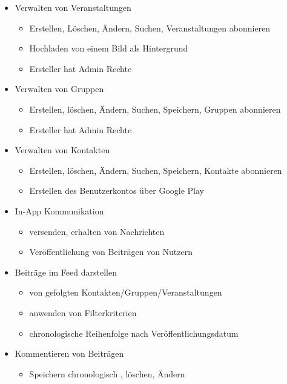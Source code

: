 \documentclass[parskip=full]{scrartcl}
\begin{document}
	\begin{itemize}
		\item Verwalten von Veranstaltungen
		\begin{itemize}

			\item Erstellen, Löschen, Ändern, Suchen, Veranstaltungen abonnieren
			\item Hochladen von einem Bild als Hintergrund
			\item Ersteller hat Admin Rechte
		\end{itemize}

		\item Verwalten von Gruppen
		\begin{itemize}
			\item Erstellen, löschen, Ändern, Suchen, Speichern, Gruppen abonnieren
			\item Ersteller hat Admin Rechte
		\end{itemize}
		\item Verwalten von Kontakten
		\begin{itemize}
			\item Erstellen, löschen, Ändern, Suchen, Speichern, Kontakte abonnieren
			\item Erstellen des Benutzerkontos über Google Play
		\end{itemize}
		\item In-App Kommunikation
		\begin{itemize}
			\item versenden, erhalten von Nachrichten
			\item Veröffentlichung von Beiträgen von Nutzern
		\end{itemize}
		\item Beiträge im Feed darstellen
		\begin{itemize}
			\item von gefolgten Kontakten/Gruppen/Veranstaltungen
			\item anwenden von Filterkriterien
			\item chronologische Reihenfolge nach Veröffentlichungsdatum
		\end{itemize}
		\item Kommentieren von Beiträgen
		\begin{itemize}
			\item Speichern chronologisch , löschen, Ändern
		\end{itemize}
	\end{itemize}
\end{document}
